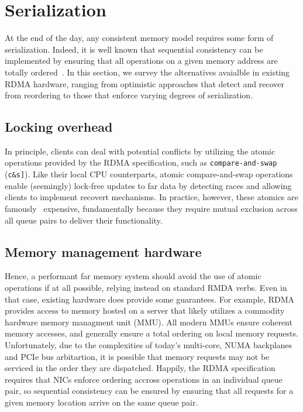 \section{Serialization}

At the end of the day, any consistent memory model requires some form
of serialization.  Indeed, it is well known that sequential
consistency can be implemented by ensuring that all operations on a
given memory address are totally ordered~\cite{ivy}.  In this section,
we survey the alternatives avaialble in existing RDMA hardware, ranging from optimistic approaches that detect and recover from reordering to those that enforce varying degrees of serialization.

\subsection{Locking overhead}

In principle, clients can deal with potential conflicts by utilizing
the atomic operations provided by the RDMA specification, such as
\texttt{compare-and-swap} (\texttt{c\&s]}).  Like their local CPU
  counterparts, atomic compare-and-swap operations enable (seemingly)
  lock-free updates to far data by detecting races and allowing
  clients to implement recovert mechanisms.  In practice, however,
  these atomics are famously~\cite{herd} expensive, fundamentally
  because they require mutual exclusion across all queue pairs to
  deliver their functionality.

\subsection{Memory management hardware}

Hence, a performant far memory system should avoid the use of atomic
operations if at all possible, relying instead on standard RMDA verbs.
Even in that case, existing hardware does provide some guarantees.  For
example, RDMA provides access to memory hosted on a server that likely
utilizes a commodity hardware memory managment unit (MMU).  All modern
MMUs ensure coherent memory accesses, and generally ensure a total
ordering on local memory requests.  Unfortunately, due to the
complexities of today's multi-core, NUMA backplanes and PCIe bus
arbitartion, it is possible that memory requests may not be serviced
in the order they are dispatched.  Happily, the RDMA specification
requires that NICs enforce ordering accross operations in an
individual queue pair, so sequential consistency can be ensured by
ensuring that all requests for a given memory location arrive on the
same queue pair.

